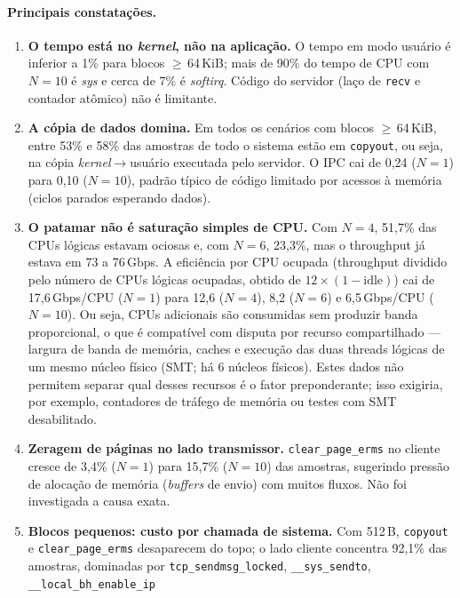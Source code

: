 \documentclass[12pt,a4paper]{article}
\newcommand{\SI}[2]{\mbox{#1\,#2}}
\begin{document}
\paragraph{Principais constatações.}
\begin{enumerate}
  \item \textbf{O tempo está no \textit{kernel}, não na aplicação.} O tempo
  em modo usuário é inferior a 1\% para blocos $\ge$\,\SI{64}{KiB}; mais de
  90\% do tempo de CPU com $N=10$ é \textit{sys} e cerca de 7\% é \textit{softirq}.
  Código do servidor (laço de \texttt{recv} e contador atômico) não é
  limitante.
  \item \textbf{A cópia de dados domina.} Em todos os cenários com blocos
  $\ge$\,\SI{64}{KiB}, entre 53\% e 58\% das amostras de todo o sistema estão em
  \texttt{copyout}, ou seja, na cópia \textit{kernel}$\to$usuário executada
  pelo servidor. O IPC cai de 0,24 ($N=1$) para 0,10 ($N=10$), padrão típico de
  código limitado por acessos à memória (ciclos parados esperando dados).
  \item \textbf{O patamar não é saturação simples de CPU.} Com $N=4$, 51,7\%
  das CPUs lógicas estavam ociosas e, com $N=6$, 23,3\%, mas o throughput já
  estava em 73 a \SI{76}{Gbps}. A eficiência por CPU ocupada
  (throughput dividido pelo número de CPUs lógicas ocupadas, obtido de
  $12\times(1-\text{idle})$) cai de \SI{17,6}{Gbps/CPU} ($N=1$) para
  12,6 ($N=4$), 8,2 ($N=6$) e \SI{6,5}{Gbps/CPU} ($N=10$). Ou seja, CPUs
  adicionais são consumidas sem produzir banda proporcional, o que é compatível
  com disputa por recurso compartilhado --- largura de banda de memória, caches
  e execução das duas threads lógicas de um mesmo núcleo físico (SMT; há 6
  núcleos físicos). Estes dados não permitem separar qual desses recursos é o
  fator preponderante; isso exigiria, por exemplo, contadores de
  tráfego de memória ou testes com SMT desabilitado.
  \item \textbf{Zeragem de páginas no lado transmissor.}
  \texttt{clear\_page\_erms} no cliente cresce de 3,4\% ($N=1$) para 15,7\%
  ($N=10$) das amostras, sugerindo pressão de alocação de memória
  (\textit{buffers} de envio) com muitos fluxos. Não foi investigada a causa
  exata.
  \item \textbf{Blocos pequenos: custo por chamada de sistema.} Com
  \SI{512}{B}, \texttt{copyout} e \texttt{clear\_page\_erms} desaparecem do topo;
  o lado cliente concentra 92,1\% das amostras, dominadas por
  \texttt{tcp\_sendmsg\_locked}, \texttt{\_\_sys\_sendto}, \texttt{\_\_local\_bh\_enable\_ip}

\end{enumerate}
\end{document}
